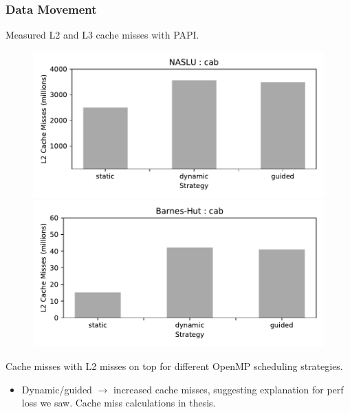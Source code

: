 \begin{frame}[label=dataMovement]
\frametitle{Data Movement}
{\tiny Measured L2 and L3 cache misses with PAPI.}
\begin{figure}[t]
\label{fig:cacheMisses-cab} 
\begin{center}
\includegraphics[scale=0.30]{./plots/L2-cacheMisses-NASLU-cab}
\includegraphics[scale=0.30]{./plots/L2-cacheMisses-nbody-cab}\\
\end{center}
\end{figure}
\begin{center}
{\tiny Cache misses with L2 misses on top for different OpenMP scheduling strategies.}
\end{center}
\begin{itemize}
\small \item \small Dynamic/guided $\rightarrow$ increased cache
  misses, suggesting explanation for perf loss we saw. Cache miss calculations in thesis.
\end{itemize}
\end{frame}

